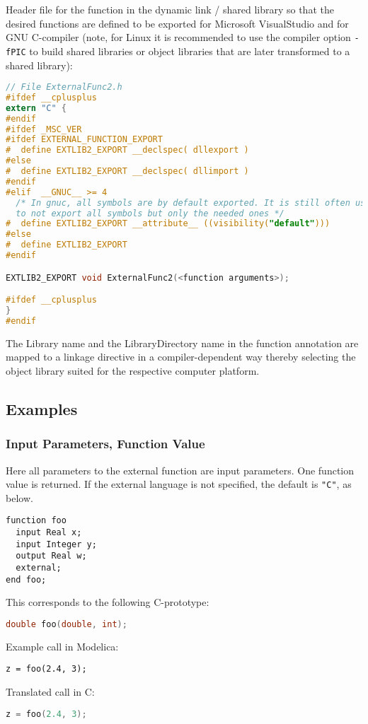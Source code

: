 \begin{example}
Header file for the function in the dynamic link / shared library
 so that the desired functions are defined to be exported
for Microsoft VisualStudio and for GNU C-compiler (note, for Linux it is
recommended to use the compiler option \lstinline!-fPIC! to build shared
libraries or object libraries that are later transformed to a shared
library):
\begin{lstlisting}[language=C]
// File ExternalFunc2.h
#ifdef __cplusplus
extern "C" {
#endif
#ifdef _MSC_VER
#ifdef EXTERNAL_FUNCTION_EXPORT
#  define EXTLIB2_EXPORT __declspec( dllexport )
#else
#  define EXTLIB2_EXPORT __declspec( dllimport )
#endif
#elif  __GNUC__ >= 4
  /* In gnuc, all symbols are by default exported. It is still often useful,
  to not export all symbols but only the needed ones */
#  define EXTLIB2_EXPORT __attribute__ ((visibility("default")))
#else
#  define EXTLIB2_EXPORT
#endif

EXTLIB2_EXPORT void ExternalFunc2(<function arguments>);

#ifdef __cplusplus
}
#endif
\end{lstlisting}
\end{example}

The Library name and the LibraryDirectory name in the function
annotation are mapped to a linkage directive in a compiler-dependent way
thereby selecting the object library suited for the respective computer
platform.

\subsection{Examples}

\subsubsection{Input Parameters, Function Value}

\begin{example}
Here all parameters to the external function are input
parameters. One function value is returned. If the external language is
not specified, the default is \lstinline!"C"!, as below.
\begin{lstlisting}[language=modelica]
function foo
  input Real x;
  input Integer y;
  output Real w;
  external;
end foo;
\end{lstlisting}
This corresponds to the following C-prototype:
\begin{lstlisting}[language=C]
double foo(double, int);
\end{lstlisting}

Example call in Modelica:
\begin{lstlisting}[language=modelica]
z = foo(2.4, 3);
\end{lstlisting}
Translated call in C:
\begin{lstlisting}[language=C]
z = foo(2.4, 3);
\end{lstlisting}
\end{example}

